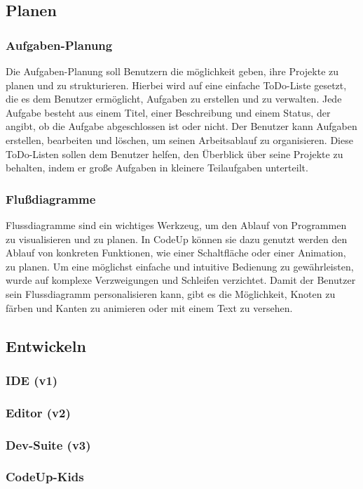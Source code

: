 \documentclass[main.tex]{subfiles}
\begin{document}
    \subsection{Planen}
    \subsubsection{Aufgaben-Planung}
    Die Aufgaben-Planung soll Benutzern die möglichkeit geben, ihre Projekte zu planen und zu strukturieren.
    Hierbei wird auf eine einfache ToDo-Liste gesetzt, die es dem Benutzer ermöglicht, Aufgaben zu erstellen und zu verwalten.
    Jede Aufgabe besteht aus einem Titel, einer Beschreibung und einem Status, der angibt, ob die Aufgabe abgeschlossen ist oder nicht.
    Der Benutzer kann Aufgaben erstellen, bearbeiten und löschen, um seinen Arbeitsablauf zu organisieren.
    Diese ToDo-Listen sollen dem Benutzer helfen, den Überblick über seine Projekte zu behalten, indem er große Aufgaben in kleinere Teilaufgaben unterteilt.
    \subsubsection{Flußdiagramme}
    Flussdiagramme sind ein wichtiges Werkzeug, um den Ablauf von Programmen zu visualisieren und zu planen.
    In CodeUp können sie dazu genutzt werden den Ablauf von konkreten Funktionen, wie einer Schaltfläche oder einer Animation, zu planen.
    Um eine möglichst einfache und intuitive Bedienung zu gewährleisten, wurde auf komplexe Verzweigungen und Schleifen verzichtet.
    Damit der Benutzer sein Flussdiagramm personalisieren kann, gibt es die Möglichkeit, Knoten zu färben und Kanten zu animieren oder mit einem Text zu versehen.
    \subsection{Entwickeln}
    \subsubsection{IDE (v1)}
    \subsubsection{Editor (v2)}
    \subsubsection{Dev-Suite (v3)}
    \subsubsection{CodeUp-Kids}
\end{document}
